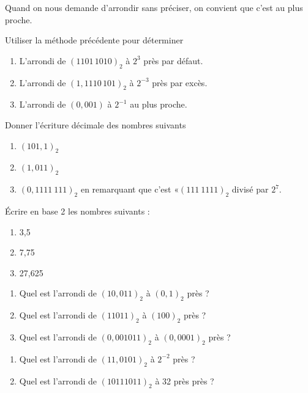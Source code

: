 \begin{remarque}
	Quand on nous demande d'arrondir sans préciser, on convient que c'est au plus proche.
\end{remarque}

\begin{exercice}[]
	Utiliser la méthode précédente pour déterminer
	\begin{enumerate}
		\item 	L'arrondi de $(1101\,1010)_2$ à $2^3$ près par défaut.
		\item 	L'arrondi de $(1,1110\,101)_2$ à $2^{-3}$ près par excès.
		\item 	L'arrondi de $(0,001)$ à $2^{-1}$ au plus proche.
	\end{enumerate}
\end{exercice}

\begin{exercice}[]
	Donner l'écriture décimale des nombres suivants\begin{enumerate}
		\item 	$(101,1)_2$
		\item 	$(1,011)_2$
		\item 	$(0,1111\ 111)_2$ en remarquant que c'est «$(111\ 1111)_2$ divisé par $2^7$.
	\end{enumerate}
\end{exercice}
\begin{exercice}[]
	\'Ecrire en base 2 les nombres suivants :
	\begin{enumerate}
		\item 	3,5
		\item 	7,75
		\item 	27,625
	\end{enumerate}
\end{exercice}

\begin{exercice}[]
	\begin{enumerate}
		\item 	Quel est l'arrondi de $(10,011)_2$ à $(0,1)_2$ près ?
		\item 	Quel est l'arrondi de $(1 1011)_2$ à $(100)_2$ près ?
		\item 	Quel est l'arrondi de $(0,0010 11)_2$ à $(0,0001)_2$ près ?
	\end{enumerate}
\end{exercice}

\begin{exercice}[]
	\begin{enumerate}
		\item 	Quel est l'arrondi de $(11,0101)_2$ à $2^{-2}$ près ?
		\item 	Quel est l'arrondi de $(1011 1011)_2$ à 32 près près ?
	\end{enumerate}
\end{exercice}

